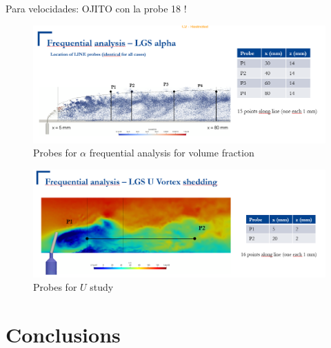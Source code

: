 Para velocidades: OJITO con la probe 18 !

\begin{figure}[h!]
	\centering
	\includegraphics[scale=0.7]{./part2_developments/figures_ch6_lagrangian_JICF/probes_vol_frac}
	\caption{Probes for $\alpha$ frequential analysis for volume fraction}
	\label{fig:probes_dx10m}
\end{figure}


\begin{figure}[h!]
	\centering
	\includegraphics[scale=0.7]{./part2_developments/figures_ch6_lagrangian_JICF/probes_U_planey0}
	\caption{Probes for $U$ study}
	\label{fig:probes_U_planey0}
\end{figure}



\section{Conclusions}